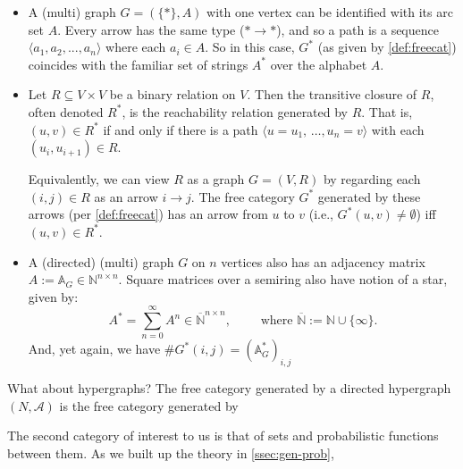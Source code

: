 \begin{itemize}
    \item 
A (multi) graph $G = (\{\ast\}, A)$ with one vertex can be identified with its arc set $A$. Every arrow has the same type ($\ast \to \ast$), and so a path is a sequence 
$\langle a_1, a_2, ..., a_n\rangle$
where each $a_i \in A$. 
So in this case, $G^*$ (as given by \cref{def:freecat}) coincides
with the familiar set of strings $A^*$ over the alphabet $A$.

    \item
Let $R \subseteq V \times V$ be a binary relation on $V$.
Then the transitive closure of $R$, often denoted $R^*$,
    is the reachability relation generated by $R$. 
That is, $(u,v) \in R^*$ if and only if there is a path $\langle u{=}u_1,\, \ldots, u_n{=}v\rangle$ with each $(u_i, u_{i+1}) \in R$.

Equivalently, we can view $R$ as a graph $G = (V,R)$ by regarding each $(i,j) \in R$ as an arrow $i \to j$. The free category $G^*$ generated by these arrows (per \cref{def:freecat}) has an arrow from $u$ to $v$ (i.e., $G^*(u,v) \ne \emptyset$) iff $(u,v) \in R^*$.

\item 
A (directed) (multi) graph $G$ on $n$ vertices also has an adjacency matrix 
$A := \mathbb A_G \in \mathbb N^{n\times n}$.  Square matrices over a semiring
also have notion of a star, given by:
\[
    A^* = \sum_{n=0}^\infty A^n  \in \overline{\mathbb N}^{n\times n},
    \qquad \text{ where } \overline{\mathbb N} := \mathbb N \cup \{\infty\}.
\]
And, yet again, we have $\#G^*(i,j) = (\mathbb A_G^*)_{i,j}$
\end{itemize}


What about hypergraphs?
The free category generated by a directed hypergraph
$(N, \mathcal A)$
is the free category generated by 


\begin{defn}
    
\end{defn}


The second category of interest to us is that of sets and probabilistic functions between them. 
As we built up the theory in \cref{ssec:gen-prob},


